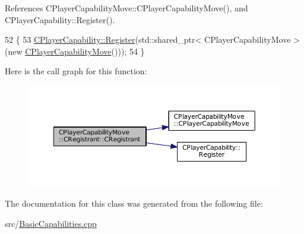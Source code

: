 References C\+Player\+Capability\+Move\+::\+C\+Player\+Capability\+Move(), and C\+Player\+Capability\+::\+Register().


\begin{DoxyCode}
52                                              \{
53     \hyperlink{classCPlayerCapability_a7e298018dcde2684451add3cfff065f7}{CPlayerCapability::Register}(std::shared\_ptr< CPlayerCapabilityMove >(\textcolor{keyword}{new} 
      \hyperlink{classCPlayerCapabilityMove_a6bfe72663b6b5fc708d23373dc293ec7}{CPlayerCapabilityMove}()));   
54 \}
\end{DoxyCode}
Here is the call graph for this function\+:\nopagebreak
\begin{figure}[H]
\begin{center}
\leavevmode
\includegraphics[width=350pt]{classCPlayerCapabilityMove_1_1CRegistrant_a9ee42fd2028701745555195a2e35922b_cgraph}
\end{center}
\end{figure}


The documentation for this class was generated from the following file\+:\begin{DoxyCompactItemize}
\item 
src/\hyperlink{BasicCapabilities_8cpp}{Basic\+Capabilities.\+cpp}\end{DoxyCompactItemize}
